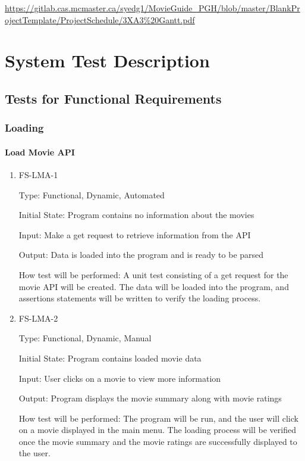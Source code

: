\documentclass[12pt, titlepage]{article}
\begin{document}
\url{https://gitlab.cas.mcmaster.ca/syedg1/MovieGuide_PGH/blob/master/BlankProjectTemplate/ProjectSchedule/3XA3%20Gantt.pdf}


\section{System Test Description}
	
\subsection{Tests for Functional Requirements}

\subsubsection{Loading}
		
\paragraph{Load Movie API}

\begin{enumerate}

\item{FS-LMA-1\\}

Type: Functional, Dynamic, Automated
					
Initial State: Program contains no information about the movies
					
Input: Make a get request to retrieve information from the API
					
Output: Data is loaded into the program and is ready to be parsed
					
How test will be performed: A unit test consisting of a get request for the movie API will be created. The data will be loaded into the program, and assertions statements will be written to verify the loading process. 
					
\item{FS-LMA-2\\}

Type: Functional, Dynamic, Manual
					
Initial State: Program contains loaded movie data
					
Input: User clicks on a movie to view more information
					
Output: Program displays the movie summary along with movie ratings
					
How test will be performed: The program will be run, and the user will click on a movie displayed in the main menu. The loading process will be verified once the movie summary and the movie ratings are successfully displayed to the user.

\end{enumerate}
\end{document}

